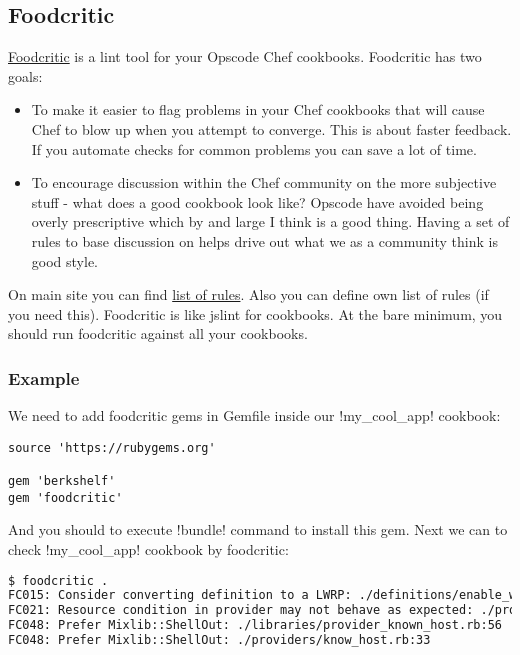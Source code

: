 \subsection{Foodcritic}

\href{http://www.foodcritic.io/}{Foodcritic} is a lint tool for your Opscode Chef cookbooks. Foodcritic has two goals:

\begin{itemize}
  \item To make it easier to flag problems in your Chef cookbooks that will cause Chef to blow up when you attempt to converge. This is about faster feedback. If you automate checks for common problems you can save a lot of time.
  \item To encourage discussion within the Chef community on the more subjective stuff - what does a good cookbook look like? Opscode have avoided being overly prescriptive which by and large I think is a good thing. Having a set of rules to base discussion on helps drive out what we as a community think is good style.
\end{itemize}

On main site you can find \href{http://www.foodcritic.io/}{list of rules}. Also you can define own list of rules (if you need this). Foodcritic is like jslint for cookbooks. At the bare minimum, you should run foodcritic against all your cookbooks.

\subsubsection{Example}

We need to add foodcritic gems in Gemfile inside our \inline!my_cool_app! cookbook:

\begin{lstlisting}[label=lst:testing-foodcritic1]
source 'https://rubygems.org'

gem 'berkshelf'
gem 'foodcritic'
\end{lstlisting}

And you should to execute \inline!bundle! command to install this gem. Next we can to check \inline!my_cool_app! cookbook by foodcritic:

\begin{lstlisting}[language=Bash,label=lst:testing-foodcritic2]
$ foodcritic .
FC015: Consider converting definition to a LWRP: ./definitions/enable_web_site.rb:1
FC021: Resource condition in provider may not behave as expected: ./providers/know_host.rb:39
FC048: Prefer Mixlib::ShellOut: ./libraries/provider_known_host.rb:56
FC048: Prefer Mixlib::ShellOut: ./providers/know_host.rb:33
\end{lstlisting}

